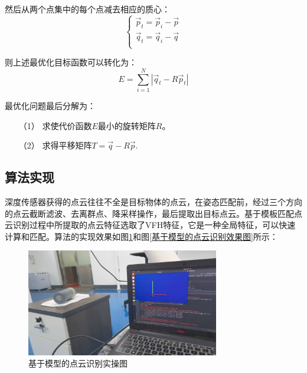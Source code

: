 \documentclass[fontset=fandol,type=bachelor,campus=harbin]{hithesisbook}
\begin{document}
然后从两个点集中的每个点减去相应的质心：
\begin{equation}
\left\{ \begin{array}{c}
	\vec{p}_t=\vec{p}_i-\vec{p}\\
	\vec{q}_t=\vec{q}_i-\vec{q}\\
\end{array} \right. 
\label{点云质心描述2} 
\end{equation}


则上述最优化目标函数可以转化为：
\begin{equation}
E=\sum_{i=1}^N{\left| \vec{q}_t-R\vec{p}_t \right|}
\label{ICP代价函数} 
\end{equation}


最优化问题最后分解为：
\begin{itemize}
\item[（1）]
求使代价函数$E$最小的旋转矩阵$R$。
\item[（2）]
求得平移矩阵$T=\vec{q}-R\vec{p}$.
\end{itemize}

\subsection{算法实现}
深度传感器获得的点云往往不全是目标物体的点云，在姿态匹配前，经过三个方向的点云截断滤波、去离群点、降采样操作，最后提取出目标点云。基于模板匹配点云识别过程中所提取的点云特征选取了VFH特征，它是一种全局特征，可以快速计算和匹配。算法的实现效果如图\ref{基于模型的点云识别实操图}和图\ref{基于模型的点云识别效果图}所示：
\begin{figure}[h]
\centering
\includegraphics[width = 0.75\textwidth]{chapter3/基于模型的点云识别实操图}
\caption{基于模型的点云识别实操图}
\label{基于模型的点云识别实操图}
\end{figure}
\end{document}
